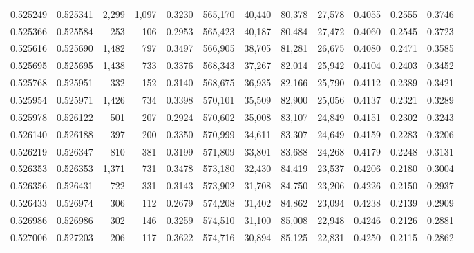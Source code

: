 \begin{tabular}{rrrrrrrrrrrrr}
0.525249 & 0.525341 & 2,299 & 1,097 &                                     0.3230 & 565,170 &  40,440 &  80,378 &  27,578 & 0.4055 & 0.2555 & 0.3746 \\
0.525366 & 0.525584 &   253 &   106 &                                     0.2953 & 565,423 &  40,187 &  80,484 &  27,472 & 0.4060 & 0.2545 & 0.3723 \\
0.525616 & 0.525690 & 1,482 &   797 &                                     0.3497 & 566,905 &  38,705 &  81,281 &  26,675 & 0.4080 & 0.2471 & 0.3585 \\
0.525695 & 0.525695 & 1,438 &   733 &                                     0.3376 & 568,343 &  37,267 &  82,014 &  25,942 & 0.4104 & 0.2403 & 0.3452 \\
0.525768 & 0.525951 &   332 &   152 &                                     0.3140 & 568,675 &  36,935 &  82,166 &  25,790 & 0.4112 & 0.2389 & 0.3421 \\
0.525954 & 0.525971 & 1,426 &   734 &                                     0.3398 & 570,101 &  35,509 &  82,900 &  25,056 & 0.4137 & 0.2321 & 0.3289 \\
0.525978 & 0.526122 &   501 &   207 &                                     0.2924 & 570,602 &  35,008 &  83,107 &  24,849 & 0.4151 & 0.2302 & 0.3243 \\
0.526140 & 0.526188 &   397 &   200 &                                     0.3350 & 570,999 &  34,611 &  83,307 &  24,649 & 0.4159 & 0.2283 & 0.3206 \\
0.526219 & 0.526347 &   810 &   381 &                                     0.3199 & 571,809 &  33,801 &  83,688 &  24,268 & 0.4179 & 0.2248 & 0.3131 \\
0.526353 & 0.526353 & 1,371 &   731 &                                     0.3478 & 573,180 &  32,430 &  84,419 &  23,537 & 0.4206 & 0.2180 & 0.3004 \\
0.526356 & 0.526431 &   722 &   331 &                                     0.3143 & 573,902 &  31,708 &  84,750 &  23,206 & 0.4226 & 0.2150 & 0.2937 \\
0.526433 & 0.526974 &   306 &   112 &                                     0.2679 & 574,208 &  31,402 &  84,862 &  23,094 & 0.4238 & 0.2139 & 0.2909 \\
0.526986 & 0.526986 &   302 &   146 &                                     0.3259 & 574,510 &  31,100 &  85,008 &  22,948 & 0.4246 & 0.2126 & 0.2881 \\
0.527006 & 0.527203 &   206 &   117 &                                     0.3622 & 574,716 &  30,894 &  85,125 &  22,831 & 0.4250 & 0.2115 & 0.2862 \\

\end{tabular}
